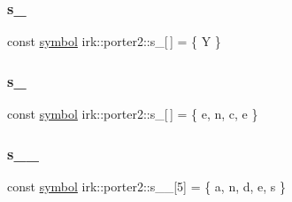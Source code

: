 \mbox{\label{namespaceirk_1_1porter2_ae181ebff2d844d2e5ed20f6510580499}} 
\subsubsection{\texorpdfstring{s\+\_}{s\_1}}
{\footnotesize\ttfamily const \mbox{\hyperlink{namespaceirk_1_1porter2_afd04c4eb58a1dabcf8f3ab2d7e9f9ed5}{symbol}} irk\+::porter2\+::s\+\_\mbox{[}$\,$\mbox{]} = \{ \textquotesingle{}Y\textquotesingle{} \}\hspace{0.3cm}{\ttfamily [static]}}

\mbox{\label{namespaceirk_1_1porter2_a94c128fb4a98d1be340e5b619c9c666e}} 
\subsubsection{\texorpdfstring{s\+\_}{s\_10}}
{\footnotesize\ttfamily const \mbox{\hyperlink{namespaceirk_1_1porter2_afd04c4eb58a1dabcf8f3ab2d7e9f9ed5}{symbol}} irk\+::porter2\+::s\+\_\mbox{[}$\,$\mbox{]} = \{ \textquotesingle{}e\textquotesingle{}, \textquotesingle{}n\textquotesingle{}, \textquotesingle{}c\textquotesingle{}, \textquotesingle{}e\textquotesingle{} \}\hspace{0.3cm}{\ttfamily [static]}}

\mbox{\label{namespaceirk_1_1porter2_a0495f0cdfa084ce52e230893aaa6865d}} 
\subsubsection{\texorpdfstring{s\+\_\+\_}{s\_10\_0}}
{\footnotesize\ttfamily const \mbox{\hyperlink{namespaceirk_1_1porter2_afd04c4eb58a1dabcf8f3ab2d7e9f9ed5}{symbol}} irk\+::porter2\+::s\+\_\+\_\mbox{[}5\mbox{]} = \{ \textquotesingle{}a\textquotesingle{}, \textquotesingle{}n\textquotesingle{}, \textquotesingle{}d\textquotesingle{}, \textquotesingle{}e\textquotesingle{}, \textquotesingle{}s\textquotesingle{} \}\hspace{0.3cm}{\ttfamily [static]}}

